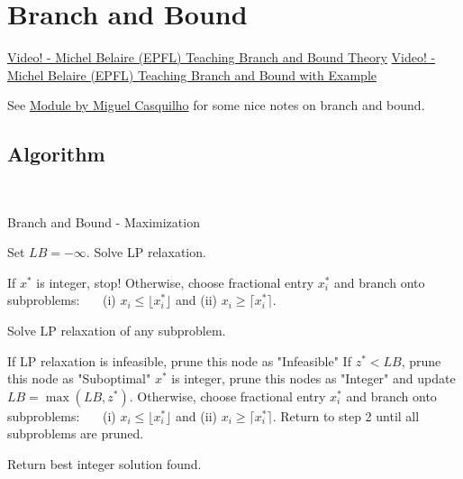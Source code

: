 \documentclass[../open-optimization/open-optimization.tex]{subfiles}
\begin{document}
\section{Branch and Bound}
\href{https://www.youtube.com/watch?v=SdXPNaID-T8}{Video! -  Michel Belaire (EPFL) Teaching Branch and Bound Theory}
\href{https://www.youtube.com/watch?v=nKXZYQUtvAY}{Video! -  Michel Belaire (EPFL) Teaching Branch and Bound with Example}

See \href{http://web.tecnico.ulisboa.pt/mcasquilho/compute/_linpro/TaylorB_module_c.pdf}{Module by Miguel Casquilho} for some nice notes on branch and bound.


\subsection{Algorithm}


\begin{algorithm}[H]
\\
\caption{Branch and Bound - Maximization}\label{alg:branch-and-bound-max}
\begin{algorithmic}[1]
	\State Set $LB = - \infty$.
 	\State Solve LP relaxation. 
	\begin{algsubstates}
        		\State If $x^*$ is integer, stop!
        		\State Otherwise, choose fractional entry $x_i^*$ and branch onto subproblems:\ \ \ \hspace{3cm}  (i) $x_i \leq \lfloor x^*_i \rfloor$ and (ii) $x_i \geq \lceil x^*_i \rceil$.        \end{algsubstates}
	\State Solve LP relaxation of any subproblem.
		\begin{algsubstates}
		\State If LP relaxation is infeasible, prune this node as "Infeasible"
        		\State If $z^* < LB$, prune this node as "Suboptimal"
		\State $x^*$ is integer, prune this nodes as "Integer" and update $LB = \max(LB, z^*)$.
		\State Otherwise, choose fractional entry $x_i^*$ and branch onto subproblems:\ \ \ \hspace{3cm}  (i) $x_i \leq \lfloor x^*_i \rfloor$ and (ii) $x_i \geq \lceil x^*_i \rceil$.     Return to step 2 until all subproblems are pruned.
      \end{algsubstates}
      \State Return best integer solution found.
	\end{algorithmic}
\end{algorithm}

%
%
%
\end{document}
